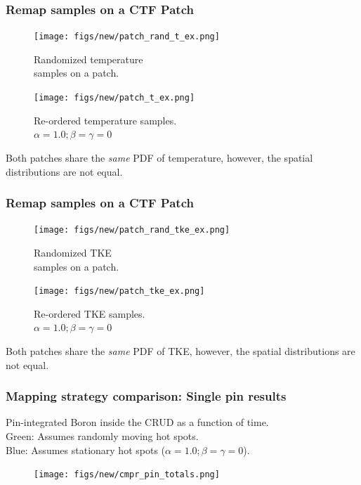 \documentclass[t, pdftex]{beamer}
\begin{document}
\begin{frame}
\frametitle{Remap samples on a CTF Patch}
    \begin{figure}
        \centering
        \begin{minipage}{.5\textwidth}
            \centering
            \texttt{[image: figs/new/patch\_rand\_t\_ex.png]}
            \caption{\centering Randomized temperature \\ samples on a patch.}
        \end{minipage}%
        \begin{minipage}{.5\textwidth}
            \centering
            \texttt{[image: figs/new/patch\_t\_ex.png]}
            \caption{\centering Re-ordered temperature samples. \\ $\alpha=1.0; \beta=\gamma=0$}
        \end{minipage}
    \end{figure}
Both patches share the \emph{same} PDF of temperature, however, the spatial distributions are not equal.
\end{frame}

\begin{frame}
\frametitle{Remap samples on a CTF Patch}
    \begin{figure}
        \centering
        \begin{minipage}{.5\textwidth}
            \centering
            \texttt{[image: figs/new/patch\_rand\_tke\_ex.png]}
            \caption{\centering Randomized TKE \\  samples on a patch.}
        \end{minipage}%
        \begin{minipage}{.5\textwidth}
            \centering
            \texttt{[image: figs/new/patch\_tke\_ex.png]}
            \caption{\centering Re-ordered TKE samples. \\ $\alpha=1.0; \beta=\gamma=0$}
        \end{minipage}
    \end{figure}
Both patches share the \emph{same} PDF of TKE, however, the spatial distributions are not equal.
\end{frame}

\begin{frame}
\frametitle{Mapping strategy comparison: Single pin results}
\tiny{
Pin-integrated Boron inside the CRUD as a function of time.  \\ 
{\color{green} Green: Assumes randomly moving hot spots.} \\
{\color{blue} Blue: Assumes stationary hot spots ($\alpha=1.0; \beta=\gamma=0$).}
}
\begin{figure}[!htbp]
\centering
\texttt{[image: figs/new/cmpr\_pin\_totals.png]}
\label{model_overview}
\end{figure}
\end{frame}
\end{document}
